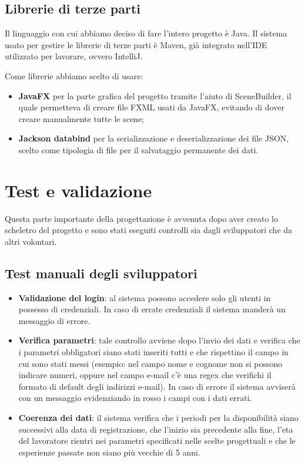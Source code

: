 \documentclass{article}
\begin{document}
    \subsection{Librerie di terze parti}

    Il linguaggio con cui abbiamo deciso di fare l'intero progetto è Java. Il sistema usato per gestire le librerie di terze parti è Maven, già integrato nell'IDE utilizzato per lavorare, ovvero IntelliJ. 
    
    Come librerie abbiamo scelto di usare:
    \begin{itemize}
        \item[] \textbf{JavaFX} per la parte grafica del progetto tramite l'aiuto di SceneBuilder, il quale permetteva di creare file FXML usati da JavaFX, evitando di dover creare manualmente tutte le scene;
        \item[] \textbf{Jackson databind} per la serializzazione e deserializzazione dei file JSON, scelto come tipologia di file per il salvataggio permanente dei dati.
    \end{itemize}

    \section{Test e validazione}

    Questa parte importante della progettazione è avvenuta dopo aver creato lo scheletro del progetto e sono stati eseguiti controlli sia dagli sviluppatori che da altri volontari.

    \subsection{Test manuali degli sviluppatori}

    \begin{itemize}
        \item[] \textbf{Validazione del login}: al sistema possono accedere solo gli utenti in possesso di credenziali. In caso di errate credenziali il sistema manderà un messaggio di errore.
        \item[] \textbf{Verifica parametri}: tale controllo avviene dopo l'invio dei dati e verifica che i parametri obbligatori siano stati inseriti tutti e che rispettino il campo in cui sono stati messi (esempio: nel campo nome e cognome non si possono indicare numeri, oppure nel campo e-mail c'è una regex che verifichi il formato di default degli indirizzi e-mail). In caso di errore il sistema avviserà con un messaggio evidenziando in rosso i campi con i dati errati.
        \item[] \textbf{Coerenza dei dati}: il sistema verifica che i periodi per la disponibilità siano successivi alla data di registrazione, che l'inizio sia precedente alla fine, l'eta del lavoratore rientri nei parametri specificati nelle scelte progettuali e che le esperienze passate non siano più vecchie di 5 anni.
    \end{itemize}
\end{document}
